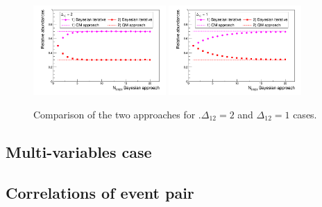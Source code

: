 \begin{figure}[!htb]
\centering
\includegraphics[width=0.45\textwidth]{../png/figIterativeDelta2.png}
\includegraphics[width=0.45\textwidth]{../png/figIterativeDelta1.png}
\caption{Comparison of the two approaches for .$\Delta_{12} = 2$ and
  $\Delta_{12} = 1$ cases.}
\label{fig:IterGaus2}
\end{figure}

\subsection{Multi-variables case}

\subsection{Correlations of event pair}

